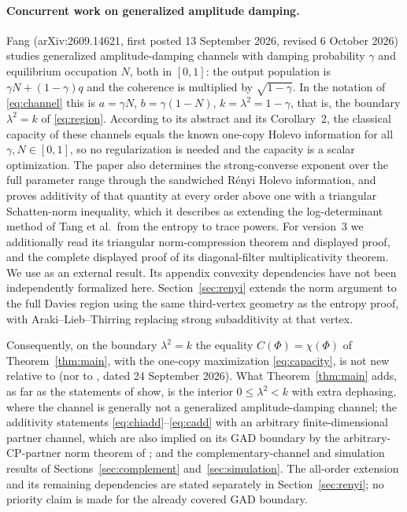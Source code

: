 \documentclass[11pt]{article}
\begin{document}
\paragraph{Concurrent work on generalized amplitude damping.}
Fang \cite{fang} (arXiv:2609.14621, first posted 13 September 2026, revised 6 October 2026) studies generalized amplitude-damping channels with damping probability $\gamma$ and equilibrium occupation $N$, both in $[0,1]$: the output population is $\gamma N+(1-\gamma)q$ and the coherence is multiplied by $\sqrt{1-\gamma}$. In the notation of \eqref{eq:channel} this is $a=\gamma N$, $b=\gamma(1-N)$, $k=\lambda^2=1-\gamma$, that is, the boundary $\lambda^2=k$ of \eqref{eq:region}. According to its abstract and its Corollary~2, the classical capacity of these channels equals the known one-copy Holevo information for all $\gamma,N\in[0,1]$, so no regularization is needed and the capacity is a scalar optimization. The paper also determines the strong-converse exponent over the full parameter range through the sandwiched R\'enyi Holevo information, and proves additivity of that quantity at every order above one with a triangular Schatten-norm inequality, which it describes as extending the log-determinant method of Tang et al.\ from the entropy to trace powers. For version~3 we additionally read its triangular norm-compression theorem and displayed proof, and the complete displayed proof of its diagonal-filter multiplicativity theorem. We use \cite[Theorem~3]{fang} as an external result. Its appendix convexity dependencies have not been independently formalized here. Section~\ref{sec:renyi} extends the norm argument to the full Davies region using the same third-vertex geometry as the entropy proof, with Araki--Lieb--Thirring replacing strong subadditivity at that vertex.

Consequently, on the boundary $\lambda^2=k$ the equality $C(\Phi)=\chi(\Phi)$ of Theorem~\ref{thm:main}, with the one-copy maximization \eqref{eq:capacity}, is not new relative to \cite{fang} (nor to \cite{openai}, dated 24 September 2026). What Theorem~\ref{thm:main} adds, as far as the statements of \cite{fang} show, is the interior $0\le\lambda^2<k$ with extra dephasing, where the channel is generally not a generalized amplitude-damping channel; the additivity statements \eqref{eq:chiadd}--\eqref{eq:cadd} with an arbitrary finite-dimensional partner channel, which are also implied on its GAD boundary by the arbitrary-CP-partner norm theorem of \cite{fang}; and the complementary-channel and simulation results of Sections~\ref{sec:complement} and~\ref{sec:simulation}. The all-order extension and its remaining dependencies are stated separately in Section~\ref{sec:renyi}; no priority claim is made for the already covered GAD boundary.
\end{document}
